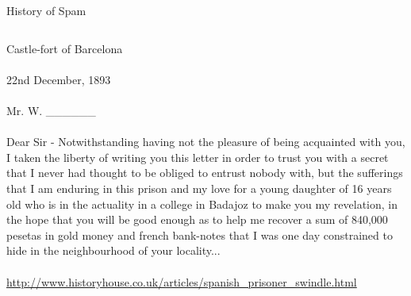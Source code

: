 \documentclass[nobackground,dvipsnames,table,aspectratio=169]{beamer}
\begin{document}
\begin{frame}{History of Spam}
    \scriptsize
    \begin{columns}
            Castle-fort of Barcelona\\~\\
            22nd December, 1893\\~\\
            Mr. W. ______\\~\\
            Dear Sir - Notwithstanding having not the pleasure of being acquainted with you, I taken the liberty of writing you this letter in order to trust you with a secret that I never had thought to be obliged to entrust nobody with, but the sufferings that I am enduring in this prison and my love for a young daughter of 16 years old who is in the actuality in a college in Badajoz to make you my revelation, in the hope that you will be good enough as to help me recover a sum of 840,000 pesetas in gold money and french bank-notes that I was one day constrained to hide in the neighbourhood of your locality...\\~\\
            \url{http://www.historyhouse.co.uk/articles/spanish_prisoner_swindle.html}


\end{columns}
\end{frame}
\end{document}
